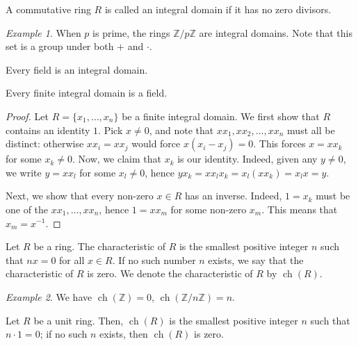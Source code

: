 \documentclass[11pt]{article}
\newcommand{\Z}{\mathbb{Z}}
\DeclareMathOperator{\ch}{ch}
\theoremstyle{definition}
\theoremstyle{remark}
\newtheorem*{example}{Example}
\numberwithin{equation}{section}
\begin{document}
    \begin{definition}
        A commutative ring $R$ is called an integral domain if it has no zero
        divisors.
    \end{definition}
    \begin{example}
        When $p$ is prime, the rings $\Z/p\Z$ are integral domains. Note that this
        set is a group under both $+$ and $\cdot$.
    \end{example}

    \begin{lemma}
        Every field is an integral domain.
    \end{lemma}

    \begin{theorem}
        Every finite integral domain is a field.
    \end{theorem}
    \begin{proof}
        Let $R = \{x_1, \dots, x_n\}$ be a finite integral domain. We first show that
        $R$ contains an identity $1$. Pick $x \neq 0$, and note that $x x_1, x x_2,
        \dots, x x_n$ must all be distinct: otherwise $x x_i = x x_j$ would force
        $x(x_i - x_j) = 0$. This forces $x = x x_k$ for some $x_k \neq 0$. Now, we
        claim that $x_k$ is our identity. Indeed, given any $y \neq 0$, we write $y =
        xx_l$ for some $x_l \neq 0$, hence $yx_k = x x_l x_k = x_l(x x_k) = x_lx =
        y$.

        Next, we show that every non-zero $x \in R$ has an inverse. Indeed, $1 = x_k$
        must be one of the $x x_1, \dots, x x_n$, hence $1 = x x_m$ for some non-zero
        $x_m$. This means that $x_m = x^{-1}$.
    \end{proof}

    \begin{definition}
        Let $R$ be a ring. The characteristic of $R$ is the smallest positive integer
        $n$ such that $nx = 0$ for all $x \in R$. If no such number $n$ exists, we
        say that the characteristic of $R$ is zero. We denote the characteristic of
        $R$ by $\ch(R)$.
    \end{definition}
    \begin{example}
        We have $\ch(\Z) = 0$, $\ch(\Z/n\Z) = n$.
    \end{example}

    \begin{lemma}
        Let $R$ be a unit ring. Then, $\ch(R)$ is the smallest positive integer $n$
        such that $n\cdot 1 = 0$; if no such $n$ exists, then $\ch(R)$ is zero.
    \end{lemma}
\end{document}
